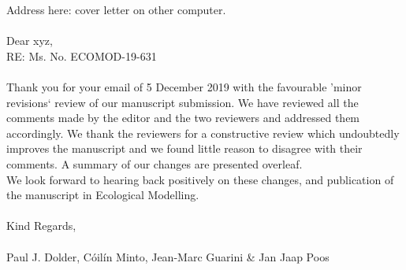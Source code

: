 \documentclass{article}
\begin{document}
\large

Address here: cover letter on other computer. \\
\\
Dear xyz, \\
RE: Ms. No. ECOMOD-19-631 \\
\\
Thank you for your email of 5 December 2019 with the favourable 'minor
revisions` review of our manuscript submission. We have reviewed all the
comments made by the editor and the two reviewers and addressed them
accordingly. We thank the reviewers for a constructive review which undoubtedly
improves the manuscript and we found little reason to disagree with their
comments. A summary of our changes are presented overleaf.  \\

We look forward to hearing back positively on these changes, and publication of
the manuscript in Ecological Modelling. \\
\\
Kind Regards,\\
\\
Paul J. Dolder, Cóilín Minto, Jean-Marc Guarini \& Jan Jaap Poos

\newpage
\end{document}

